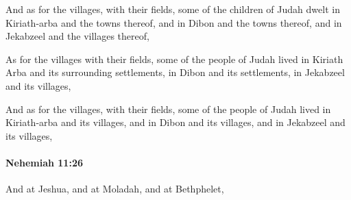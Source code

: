 			\begin{versebox}
					\item[BHS] 
					\item[LXX] 
					\item[ASV] And as for the villages, with their fields, some of the children of Judah dwelt in Kiriath-arba and the towns thereof, and in Dibon and the towns thereof, and in Jekabzeel and the villages thereof,
					\item[NIV] As for the villages with their fields, some of the people of Judah lived in Kiriath Arba and its surrounding settlements, in Dibon and its settlements, in Jekabzeel and its villages,
					\item[NRSV] And as for the villages, with their fields, some of the people of Judah lived in Kiriath-arba and its villages, and in Dibon and its villages, and in Jekabzeel and its villages,
			\end{versebox}

		\paragraph{Nehemiah 11:26} %
			\label{NEHEMIAH-11-26}

			And at Jeshua, and at Moladah, and at Bethphelet,

